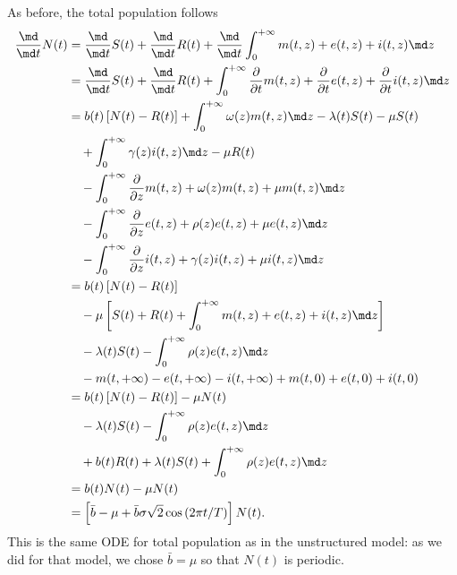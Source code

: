 \documentclass{jpmarticle}
\begin{document}
As before, the total population follows
\begin{equation}
  \begin{split}
    \frac{\md}{\md t} N(t)
    &= \frac{\md}{\md t} S(t)
    + \frac{\md}{\md t} R(t)
    + \frac{\md}{\md t} \int_0^{+\infty} m(t, z) + e(t, z) + i(t, z) \md z
    \\
    &= \frac{\md}{\md t} S(t)
    + \frac{\md}{\md t} R(t)
    + \int_0^{+\infty} \frac{\partial}{\partial t} m(t, z)
    + \frac{\partial}{\partial t} e(t, z)
    + \frac{\partial}{\partial t} i(t, z) \md z
    \\
    &=
    b(t) \left[N(t) - R(t)\right]
    + \int_0^{+\infty} \omega(z) m(t, z) \md z
    - \lambda(t) S(t) - \mu S(t)
    \\ & \quad {}
    + \int_0^{+\infty} \gamma(z) i(t, z) \md z
    - \mu R(t)
    \\ & \quad {}
    - \int_0^{+\infty}
    \frac{\partial}{\partial z} m(t, z)
    + \omega(z) m(t, z)
    + \mu m(t, z)
    \md z
    \\ & \quad {}
    - \int_0^{+\infty}
    \frac{\partial}{\partial z} e(t, z)
    + \rho(z) e(t, z)
    + \mu e(t, z)
    \md z
    \\ & \quad {}
    - \int_0^{+\infty}
    \frac{\partial}{\partial z} i(t, z)
    + \gamma(z) i(t, z)
    + \mu i(t, z)
    \md z
    \\
    &=
    b(t) \left[N(t) - R(t)\right]
    \\ & \quad {}
    - \mu \left[
      S(t) + R(t)
      + \int_0^{+\infty}
      m(t, z) + e(t, z) + i(t, z)
      \md z
    \right]
    \\ & \quad {}
    - \lambda(t) S(t)
    - \int_0^{+\infty}
    \rho(z) e(t, z)
    \md z
    \\ & \quad {}
    - m(t, +\infty) - e(t, +\infty) - i(t, +\infty)
    + m(t, 0) + e(t, 0) + i(t, 0)
    \\
    &=
    b(t) \left[N(t) - R(t)\right]
    - \mu N(t)
    \\ & \quad {}
    - \lambda(t) S(t)
    - \int_0^{+\infty}
    \rho(z) e(t, z)
    \md z
    \\ & \quad {}
    + b(t) R(t)
    + \lambda(t) S(t)
    + \int_0^{+\infty} \rho(z) e(t, z) \md z
    \\
    &= b(t) N(t) - \mu N(t)
    \\
    &= \left[
      \bar{b} - \mu
      + \bar{b} \sigma \sqrt{2} \cos\left(2 \pi t / T\right)
    \right] N(t).
  \end{split}
\end{equation}
This is the same ODE for total population as in the unstructured
model: as we did for that model, we chose $\bar{b} = \mu$ so that
$N(t)$ is periodic.
\end{document}
